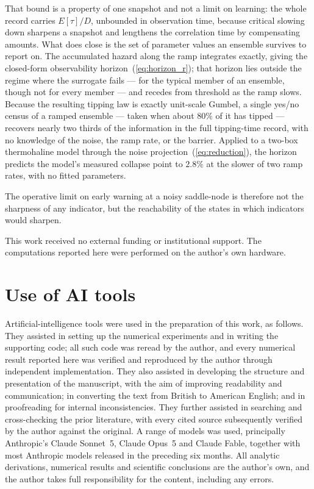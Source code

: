 \documentclass[%
 aip,
 cha,
 amsmath,amssymb,
 reprint,
 superscriptaddress,
 floatfix,
]{revtex4-2}
\begin{document}
That bound is a property of one snapshot and not a limit on learning: the whole record carries $E[\tau]/D$, unbounded in observation time, because critical slowing down sharpens a snapshot and lengthens the correlation time by compensating amounts.  What does close is the set of parameter values an ensemble survives to report on.  The accumulated hazard along the ramp integrates exactly, giving the closed-form observability horizon~(\ref{eq:horizon_r}); that horizon lies outside the regime where the surrogate fails --- for the typical member of an ensemble, though not for every member --- and recedes from threshold as the ramp slows.  Because the resulting tipping law is exactly unit-scale Gumbel, a single yes/no census of a ramped ensemble --- taken when about $80\%$ of it has tipped --- recovers nearly two thirds of the information in the full tipping-time record, with no knowledge of the noise, the ramp rate, or the barrier.  Applied to a two-box thermohaline model through the noise projection~(\ref{eq:reduction}), the horizon predicts the model's measured collapse point to $2.8\%$ at the slower of two ramp rates, with no fitted parameters.

The operative limit on early warning at a noisy saddle-node is therefore not the sharpness of any indicator, but the reachability of the states in which indicators would sharpen.

\begin{acknowledgments}
This work received no external funding or institutional support.  The
computations reported here were performed on the author's own hardware.
\end{acknowledgments}

\section*{Use of AI tools}
Artificial-intelligence tools were used in the preparation of this work, as
follows.  They assisted in setting up the numerical experiments and in writing
the supporting code; all such code was reread by the author, and every numerical
result reported here was verified and reproduced by the author through
independent implementation.  They also assisted in developing the structure and
presentation of the manuscript, with the aim of improving readability and
communication; in converting the text from British to American English; and in
proofreading for internal inconsistencies.  They further assisted in searching
and cross-checking the prior literature, with every cited source subsequently
verified by the author against the original.  A range of models was used,
principally Anthropic's Claude Sonnet~5, Claude Opus~5 and Claude Fable,
together with most Anthropic models released in the preceding six months.  All
analytic derivations, numerical results and scientific conclusions are the
author's own, and the author takes full responsibility for the content,
including any errors.
\end{document}
